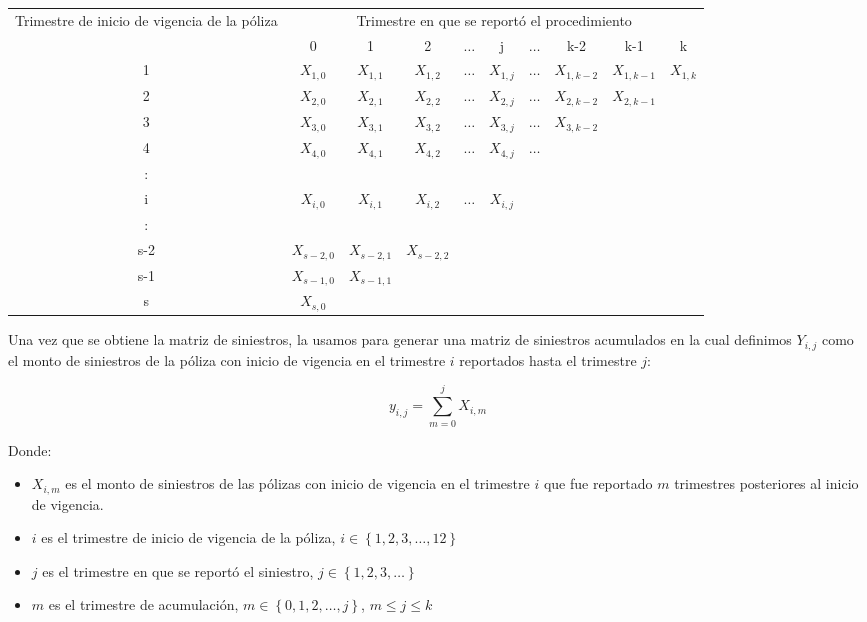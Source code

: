 \documentclass[11pt,twoside,openright,spanish]{report}
\numberwithin{equation}{chapter}
\numberwithin{figure}{chapter}
\numberwithin{table}{chapter}
\begin{document}
	\begin{table}[ht]
	\centering
	\begin{tabularx}{\linewidth}{c|ccccccccc}
		\multirow{2}{4cm}{Trimestre de inicio de vigencia de la póliza} & \multicolumn{9}{c}{Trimestre en que se reportó el procedimiento} \\
			& 0  & 1 & 2 & $ \dots $ & j & $\dots $ & k-2 & k-1 &  k \\
		\midrule
		1      &  $X_{1,0}^{}$ & $X_{1,1}^{}$ & $X_{1,2}^{}$ & $ \dots $ & $X_{1,j}^{}$ & $ \dots $ & $X_{1,k-2}^{}$ & $X_{1,k-1}^{}$ & $X_{1,k}^{}$ \\
		2      &  $X_{2,0}^{}$ & $X_{2,1}^{}$ & $X_{2,2}^{}$ & $ \dots $ & $X_{2,j}^{}$ & $ \dots $ & $X_{2,k-2}^{}$ & $X_{2,k-1}^{}$ & \\
		3      &  $X_{3,0}^{}$ & $X_{3,1}^{}$ & $X_{3,2}^{}$ & $ \dots $ & $X_{3,j}^{}$ & $ \dots $ & $X_{3,k-2}^{}$ & & \\
		4      &  $X_{4,0}^{}$ & $X_{4,1}^{}$ & $X_{4,2}^{}$ & $ \dots $ & $X_{4,j}^{}$ & $ \dots $ & & & \\
		:      & & & & & & & & &\\
		i      &  $X_{i,0}^{}$ & $X_{i,1}^{}$ & $X_{i,2}^{}$ & $ \dots $ & $X_{i,j}^{}$ & & & & \\
		:      & & & & & & & & & \\
		s-2      &  $X_{s-2,0}^{}$ & $X_{s-2,1}^{}$ & $X_{s-2,2}^{}$ & & & & & & \\
		s-1      &  $X_{s-1,0}^{}$ & $X_{s-1,1}^{}$ & & & & & & & \\
		s      &  $X_{s,0}^{}$ & & & & & & & & \\
	\end{tabularx}
	\end{table}

	\vspace{1cm}

	Una vez que se obtiene la matriz de siniestros, la usamos para generar una matriz de siniestros acumulados en la cual definimos ${Y}_{i,j}$ como el monto de siniestros de la póliza con inicio de vigencia en el trimestre $i$ reportados hasta el trimestre $j$:
	
	$${y}_{i,j}=\sum _{m=0}^{j}{X}_{i,m}$$
	
	Donde:
	
	\begin{itemize}
		\item ${X}_{i,m}$ es el monto de siniestros de las pólizas con inicio de vigencia en el trimestre $i$ que fue reportado $m$ trimestres posteriores al inicio de vigencia.
		\item $i$ es el trimestre de inicio de vigencia de la póliza, $i\in \left\{1,2,3,\dots ,12\right\}$
		\item $j$ es el trimestre en que se reportó el siniestro,  $j\in \left\{1,2,3,\dots\right\}$
		\item $m$ es el trimestre de acumulación, $m\in \left\{0,1,2,\dots ,j\right\}$, $m\le j\le k$
	\end{itemize} 
	
\end{document}
